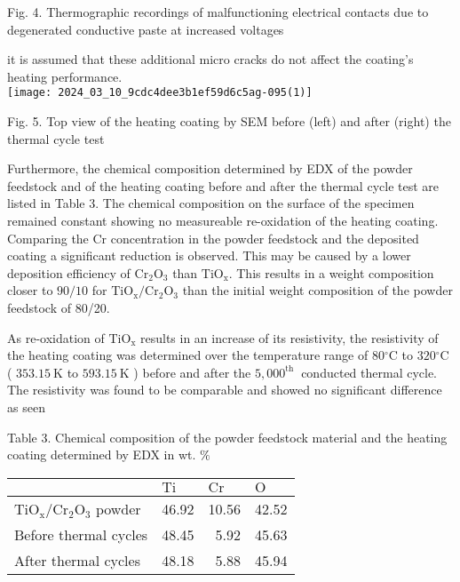 \documentclass[10pt]{article}
\begin{document}
Fig. 4. Thermographic recordings of malfunctioning electrical contacts due to degenerated conductive paste at increased voltages

it is assumed that these additional micro cracks do not affect the coating's heating performance.\\
\texttt{[image: 2024\_03\_10\_9cdc4dee3b1ef59d6c5ag-095(1)]}

Fig. 5. Top view of the heating coating by SEM before (left) and after (right) the thermal cycle test

Furthermore, the chemical composition determined by EDX of the powder feedstock and of the heating coating before and after the thermal cycle test are listed in Table 3. The chemical composition on the surface of the specimen remained constant showing no measureable re-oxidation of the heating coating. Comparing the $\mathrm{Cr}$ concentration in the powder feedstock and the deposited coating a significant reduction is observed. This may be caused by a lower deposition efficiency of $\mathrm{Cr}_{2} \mathrm{O}_{3}$ than $\mathrm{TiO}_{\mathrm{x}}$. This results in a weight composition closer to $90 / 10$ for $\mathrm{TiO}_{\mathrm{x}} / \mathrm{Cr}_{2} \mathrm{O}_{3}$ than the initial weight composition of the powder feedstock of 80/20.

As re-oxidation of $\mathrm{TiO}_{\mathrm{x}}$ results in an increase of its resistivity, the resistivity of the heating coating was determined over the temperature range of $80{ }^{\circ} \mathrm{C}$ to $320{ }^{\circ} \mathrm{C}$ ( $353.15 \mathrm{~K}$ to $593.15 \mathrm{~K}$ ) before and after the $5,000^{\text {th }}$ conducted thermal cycle. The resistivity was found to be comparable and showed no significant difference as seen

Table 3. Chemical composition of the powder feedstock material and the heating coating determined by EDX in wt. $\%$

\begin{center}
\begin{tabular}{l|l|r|l}
\hline
 & $\mathrm{Ti}$ & \multicolumn{1}{l|}{$\mathrm{Cr}$} & $\mathrm{O}$ \\
\hline
$\mathrm{TiO}_{\mathrm{x}} / \mathrm{Cr}_{2} \mathrm{O}_{3}$ powder & 46.92 & 10.56 & 42.52 \\
\hline
Before thermal cycles & 48.45 & 5.92 & 45.63 \\
\hline
After thermal cycles & 48.18 & 5.88 & 45.94 \\
\hline
\end{tabular}
\end{center}
\end{document}
